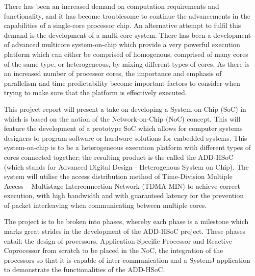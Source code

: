 \documentclass[]{article}
\begin{document}
	There has been an increased demand on computation requirements and functionality, and it has become troublesome to continue the advancements in the capabilities of a single-core processor chip. An alternative attempt to fulfil this demand is the development of a multi-core system. There has been a development of advanced multicore system-on-chip which provide a very powerful execution platform which can either be comprised of homogenous, comprised of many cores of the same type, or heterogeneous, by mixing different types of cores. As there is an increased number of processor cores, the importance and emphasis of parallelism and time predictability become important factors to consider when trying to make sure that the platform is effectively executed.
	\par 
	This project report will present a take on developing a System-on-Chip (SoC) in which is based on the notion of the Network-on-Chip (NoC) concept. This will feature the development of a prototype SoC which allows for computer systems designers to program software or hardware solutions for embedded systems. This system-on-chip is to be a heterogeneous execution platform with different types of cores connected together; the resulting product is the called the ADD-HSoC (which stands for Advanced Digital Design - Heterogenous System on Chip). The system will utilise the access distribution method of Time-Division Multiple Access -- Multistage Interconnection Network (TDMA-MIN) to achieve correct execution, with high bandwidth and with guaranteed latency for the prevention of packet interleaving when communicating between multiple cores.
	
	
	The project is to be broken into phases, whereby each phase is a milestone which marks great strides in the development of the ADD-HSoC project. These phases entail: the design of processors, Application Specific Processor and Reactive Coprocessor from scratch to be placed in the NoC, the integration of the processors so that it is capable of inter-communication and a SystemJ application to demonstrate the functionalities of the ADD-HSoC.
	\newpage
\end{document}

